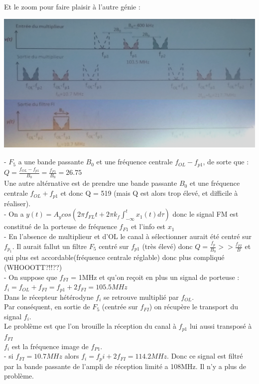 \documentclass{article}
\begin{document}
	Et le zoom pour faire plaisir à l'autre génie :\\
	\begin{center}
 	\includegraphics[scale=0.3]{TD7-4.png}
	\end{center}
	
 	
 	- $F_5$ a une bande passante $B_0$ et une fréquence centrale $f_{OL} - f_{p1}$, de sorte que : $Q = \frac{f_{OL} - f_{p1}}{B_0} = \frac{f_{F1}}{B_0} = 26.75$\\
 	Une autre altérnative est de prendre une bande passante $B_0$ et une fréquence centrale $f_{OL} + f_{p1}$ et donc Q = 519 (mais Q est alors trop élevé, et difficile à réaliser).\\
 	
 	- On a $y(t) = A_y cos(2\pi f_{FL}t + 2\pi k_f \int_{-\infty}^{t}x_1(t) d\tau)$ donc le signal FM est constitué de la porteuse de fréquence $f_{F1}$ et l'info est $x_1$\\
 	
 	- En l'absence de multiplieur et d'OL le canal à sélectionner aurait été centré sur $f_{p_1}$. Il aurait fallut un filtre $F_5$ centré sur $f_{p1}$ (très élevé) donc $Q = \frac{f_p}{B_0} >> \frac{f_{FI}}{B}$ et qui plus est accordable(fréquence centrale réglable) donc plus compliqué (WHOOOTT?!!??)\\
 	
 	- On suppose que $f_{FI}$ = 1MHz et qu'on reçoit en plus un signal de porteuse : $f_i = f_{OL} + f_{FI} = f_{p1} + 2f_{FI} = 105.5MHz$\\
 	Dans le récepteur hétérodyne $f_i$ se retrouve multiplié par $f_{OL}$.\\
 	
 	Par conséquent, en sortie de $F_5$ (centrée sur $f_{FI}$) on récupère le transport du signal $f_i$.\\
 	Le problème est que l'on brouille la réception du canal à $f_{p1}$ lui aussi transposé à $f_{FI}$\\
 	
 	$f_i$ est la fréquence image de $f_{P1}$.\\
 	
 	- si $f_{FI} = 10.7MHz$ alors $f_i = f_pi + 2f_{FI} = 114.2MHz$. Donc ce signal est filtré par la bande passante de l'ampli de réception limité a 108MHz. Il n'y a plus de problème.
\end{document}

